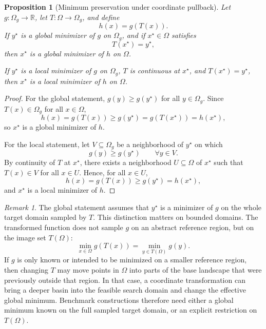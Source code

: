 \documentclass[journal]{IEEEtran}
\theoremstyle{remark}
\newtheorem{remark}{Remark}
\theoremstyle{plain}
\newtheorem{proposition}{Proposition}
\begin{document}
\begin{proposition}[Minimum preservation under coordinate pullback]
	\label{prop:coordinate-pullback-minimum}
	Let \(g:\Omega_g\to\mathbb{R}\), let \(T:\Omega\to\Omega_g\), and define
	\[
	h(x)=g(T(x)).
	\]
	If \(y^\star\) is a global minimizer of \(g\) on \(\Omega_g\), and if
	\(x^\star\in\Omega\) satisfies
	\[
	T(x^\star)=y^\star,
	\]
	then \(x^\star\) is a global minimizer of \(h\) on \(\Omega\).
	
	If \(y^\star\) is a local minimizer of \(g\) on \(\Omega_g\), \(T\) is
	continuous at \(x^\star\), and \(T(x^\star)=y^\star\), then \(x^\star\) is a
	local minimizer of \(h\) on \(\Omega\).
\end{proposition}

\begin{proof}
	For the global statement, \(g(y)\ge g(y^\star)\) for all \(y\in\Omega_g\).
	Since \(T(x)\in\Omega_g\) for all \(x\in\Omega\),
	\[
	h(x)=g(T(x))\ge g(y^\star)=g(T(x^\star))=h(x^\star),
	\]
	so \(x^\star\) is a global minimizer of \(h\).
	
	For the local statement, let \(V\subseteq\Omega_g\) be a neighborhood of
	\(y^\star\) on which
	\[
	g(y)\ge g(y^\star)
	\qquad
	\forall y\in V.
	\]
	By continuity of \(T\) at \(x^\star\), there exists a neighborhood
	\(U\subseteq\Omega\) of \(x^\star\) such that \(T(x)\in V\) for all
	\(x\in U\). Hence, for all \(x\in U\),
	\[
	h(x)=g(T(x))\ge g(y^\star)=h(x^\star),
	\]
	and \(x^\star\) is a local minimizer of \(h\).
\end{proof}

\begin{remark}
	The global statement assumes that \(y^\star\) is a minimizer of \(g\) on the
	whole target domain sampled by \(T\). This distinction matters on bounded
	domains. The transformed function does not sample \(g\) on an abstract
	reference region, but on the image set \(T(\Omega)\):
	\[
	\min_{x\in\Omega} g(T(x))
	=
	\min_{y\in T(\Omega)} g(y).
	\]
	If \(g\) is only known or intended to be minimized on a smaller reference
	region, then changing \(T\) may move points in \(\Omega\) into parts of the
	base landscape that were previously outside that region. In that case, a
	coordinate transformation can bring a deeper basin into the feasible search
	domain and change the effective global minimum. Benchmark constructions
	therefore need either a global minimum known on the full sampled target
	domain, or an explicit restriction on \(T(\Omega)\).
\end{remark}
\end{document}
